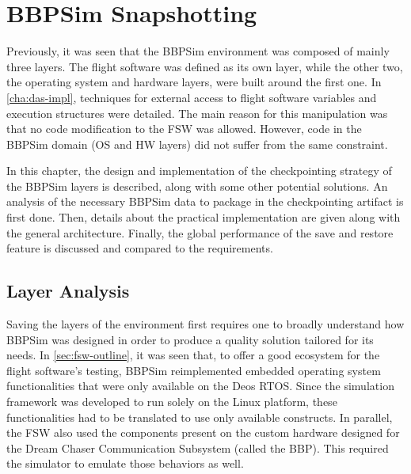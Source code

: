 {
\setlength{\parindent}{2em}
\chapter{BBPSim Snapshotting}\label{cha:bbpsim-impl}
Previously, it was seen that the \gls{BBPSim} environment was composed of mainly three layers. The flight software was defined as its own layer, while the other two, the operating system and hardware layers, were built around the first one. In \autoref{cha:das-impl}, techniques for external access to flight software variables and execution structures were detailed. The main reason for this manipulation was that no code modification to the FSW was allowed. However, code in the BBPSim domain (OS and HW layers) did not suffer from the same constraint. 

In this chapter, the design and implementation of the checkpointing strategy of the BBPSim layers is described, along with some other potential solutions. An analysis of the necessary BBPSim data to package in the checkpointing artifact is first done. Then, details about the practical implementation are given along with the general architecture. Finally, the global performance of the save and restore feature is discussed and compared to the requirements. 

\section{Layer Analysis}
Saving the layers of the environment first requires one to broadly understand how BBPSim was designed in order to produce a quality solution tailored for its needs. In \autoref{sec:fsw-outline}, it was seen that, to offer a good ecosystem for the flight software's testing, \gls{BBPSim} reimplemented embedded operating system functionalities that were only available on the Deos \gls{RTOS}. Since the simulation framework was developed to run solely on the Linux platform, these functionalities had to be translated to use only available constructs. In parallel, the FSW also used the components present on the custom hardware designed for the Dream Chaser Communication Subsystem (called the \gls{BBP}). This required the simulator to emulate those behaviors as well.

}
